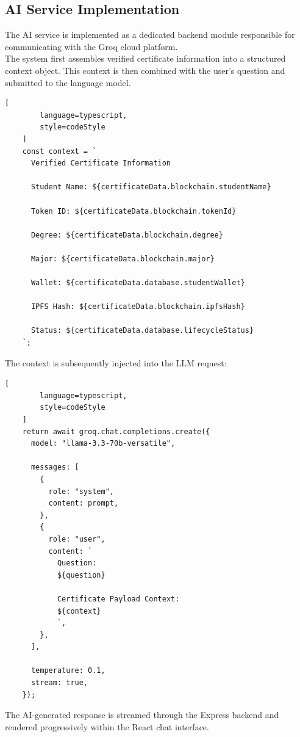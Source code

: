 \subsection{AI Service Implementation}

The AI service is implemented as a dedicated backend module responsible for communicating with the Groq cloud platform.\\

The system first assembles verified certificate information into a structured context object. This context is then combined with the user's question and submitted to the language model.

\begin{lstlisting}[
        language=typescript,
        style=codeStyle
    ]
    const context = `
      Verified Certificate Information

      Student Name: ${certificateData.blockchain.studentName}

      Token ID: ${certificateData.blockchain.tokenId}

      Degree: ${certificateData.blockchain.degree}

      Major: ${certificateData.blockchain.major}

      Wallet: ${certificateData.database.studentWallet}

      IPFS Hash: ${certificateData.blockchain.ipfsHash}

      Status: ${certificateData.database.lifecycleStatus}
    `;
\end{lstlisting}

The context is subsequently injected into the LLM request:

\begin{lstlisting}[
        language=typescript,
        style=codeStyle
    ]
    return await groq.chat.completions.create({
      model: "llama-3.3-70b-versatile",

      messages: [
        {
          role: "system",
          content: prompt,
        },
        {
          role: "user",
          content: `
            Question:
            ${question}

            Certificate Payload Context:
            ${context}
            `,
        },
      ],

      temperature: 0.1,
      stream: true,
    });
\end{lstlisting}

The AI-generated response is streamed through the Express backend and rendered progressively within the React chat interface.